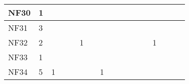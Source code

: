\begin{table}[]
{\begin{tabular}{|l|l|l|l|l|l|l|l|l|l|l|l|l|l|l|l|l|}
NF30          & 1                                                     &                                                       &    &                                                       &    &                                                       &                                                       &    &    &                                                       &    &                                                  &                                                  &    &    &    \\ \hline
NF31          & 3                                                     &                                                       &    &                                                       &    &                                                       &                                                       &    &    &                                                       &    &                                                  &                                                  &    &    &    \\ \hline
NF32          & 2                                                     &                                                       &    &                                                       & 1  &                                                       &                                                       &    &    &                                                       &    &                                                  & 1                                                &    &    &    \\ \hline
NF33          & 1                                                     &                                                       &    &                                                       &    &                                                       &                                                       &    &    &                                                       &    &                                                  &                                                  &    &    &    \\ \hline
NF34          & 5                                                     & 1                                                     &    &                                                       &    &                                                       & 1                                                     &    &    &                                                       &    &                                                  &                                                  &    &    &    \\ \hline

\end{tabular}}
\end{table}
